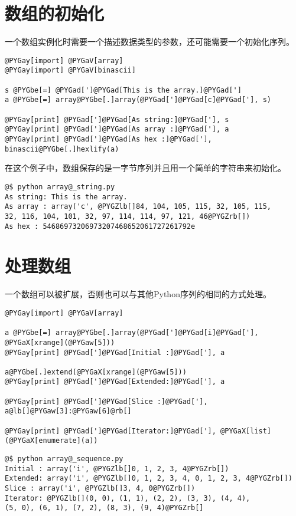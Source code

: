 \documentclass[a4paper,10pt,english]{manual}
\begin{document}
\section{数组的初始化}

一个数组实例化时需要一个描述数据类型的参数，还可能需要一个初始化序列。

\begin{Verbatim}[commandchars=@\[\]]
@PYGay[import] @PYGaV[array]
@PYGay[import] @PYGaV[binascii]

s @PYGbe[=] @PYGad[']@PYGad[This is the array.]@PYGad[']
a @PYGbe[=] array@PYGbe[.]array(@PYGad[']@PYGad[c]@PYGad['], s)

@PYGay[print] @PYGad[']@PYGad[As string:]@PYGad['], s
@PYGay[print] @PYGad[']@PYGad[As array :]@PYGad['], a
@PYGay[print] @PYGad[']@PYGad[As hex :]@PYGad['], binascii@PYGbe[.]hexlify(a)
\end{Verbatim}

在这个例子中，数组保存的是一字节序列并且用一个简单的字符串来初始化。

\begin{Verbatim}[commandchars=@\[\]]
@$ python array@_string.py
As string: This is the array.
As array : array('c', @PYGZlb[]84, 104, 105, 115, 32, 105, 115,
32, 116, 104, 101, 32, 97, 114, 114, 97, 121, 46@PYGZrb[])
As hex : 54686973206973207468652061727261792e
\end{Verbatim}


\section{处理数组}

一个数组可以被扩展，否则也可以与其他Python序列的相同的方式处理。

\begin{Verbatim}[commandchars=@\[\]]
@PYGay[import] @PYGaV[array]

a @PYGbe[=] array@PYGbe[.]array(@PYGad[']@PYGad[i]@PYGad['], @PYGaX[xrange](@PYGaw[5]))
@PYGay[print] @PYGad[']@PYGad[Initial :]@PYGad['], a

a@PYGbe[.]extend(@PYGaX[xrange](@PYGaw[5]))
@PYGay[print] @PYGad[']@PYGad[Extended:]@PYGad['], a

@PYGay[print] @PYGad[']@PYGad[Slice :]@PYGad['], a@lb[]@PYGaw[3]:@PYGaw[6]@rb[]

@PYGay[print] @PYGad[']@PYGad[Iterator:]@PYGad['], @PYGaX[list](@PYGaX[enumerate](a))
\end{Verbatim}

\begin{Verbatim}[commandchars=@\[\]]
@$ python array@_sequence.py
Initial : array('i', @PYGZlb[]0, 1, 2, 3, 4@PYGZrb[])
Extended: array('i', @PYGZlb[]0, 1, 2, 3, 4, 0, 1, 2, 3, 4@PYGZrb[])
Slice : array('i', @PYGZlb[]3, 4, 0@PYGZrb[])
Iterator: @PYGZlb[](0, 0), (1, 1), (2, 2), (3, 3), (4, 4),
(5, 0), (6, 1), (7, 2), (8, 3), (9, 4)@PYGZrb[]
\end{Verbatim}
\end{document}
